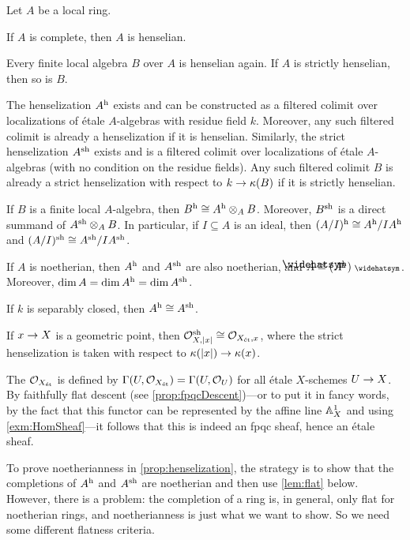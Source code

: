 \documentclass[a4paper, 10pt, oneside, DIV=9, chapterprefix=true, numbers=enddot, bibliography=totoc]{scrbook}
\begin{document}
\begin{prop}\label{prop:henselization}
	Let $A$ be a local ring.
	\begin{alphanumerate}
		\item If $A$ is complete, then $A$ is henselian.
		\item Every finite local algebra $B$ over $A$ is henselian again. If $A$ is strictly henselian, then so is $B$.
		\item The henselization $A^{\mathrm{h}}$ exists and can be constructed as a filtered colimit over localizations of étale $A$-algebras with residue field $k$. Moreover, any such filtered colimit is already a henselization if it is henselian. Similarly, the strict henselization $A^{\mathrm{sh}}$ exists and is a filtered colimit over localizations of étale $A$-algebras (with no condition on the residue fields). Any such filtered colimit $B$ is already a strict henselization with respect to $k\morphism \kappa(B)$ if it is strictly henselian.
		\item If $B$ is a finite local $A$-algebra, then $B^{\mathrm{h}}\cong A^{\mathrm{h}}\otimes_AB$. Moreover, $B^{\mathrm{sh}}$ is a direct summand of $A^{\mathrm{sh}}\otimes_AB$. In particular, if $I\subseteq A$ is an ideal, then $(A/I)^{\mathrm{h}}\cong A^{\mathrm{h}}/IA^{\mathrm{h}}$ and $(A/I)^{\mathrm{sh}}\cong A^{\mathrm{sh}}/IA^{\mathrm{sh}}$.
		\item If $A$ is noetherian, then $A^{\mathrm{h}}$ and $A^{\mathrm{sh}}$ are also noetherian, and $\roof{A}\cong (A^\h)^\complete$. Moreover, $\dim A=\dim A^{\mathrm{h}}=\dim A^{\mathrm{sh}}$.
		\item If $k$ is separably closed, then $A^{\mathrm{h}}\cong A^{\mathrm{sh}}$.
		\item If $x\morphism X$ is a geometric point, then $\mathcal{O}_{X,|x|}^{\mathrm{sh}}\cong \mathcal{O}_{X_{\mathrm{\acute{e}t}},x}$, where the strict henselization is taken with respect to $\kappa(|x|)\morphism \kappa(x)$.
	\end{alphanumerate}
\end{prop}
\begin{rem}
	The  $\mathcal{O}_{X_{\mathrm{\acute{e}t}}}$ is defined by $\operatorname{\Gamma}(U,\mathcal{O}_{X_{\mathrm{\acute{e}t}}})=\operatorname{\Gamma}(U,\mathcal{O}_U)$ for all étale $X$-schemes $U\morphism X$. By faithfully flat descent (see \cref{prop:fpqcDescent})---or to put it in fancy words, by the fact that this functor can be represented by the affine line $\mathbb{A}_X^1$ and using \cref{exm:HomSheaf}---it follows that this is indeed an fpqc sheaf, hence an étale sheaf.
\end{rem}
To prove noetherianness in \cref{prop:henselization}, the strategy is to show that the completions of $A^{\mathrm{h}}$ and $A^{\mathrm{sh}}$ are noetherian and then use \cref{lem:flat} below. However, there is a problem: the completion of a ring is, in general, only flat for noetherian rings, and noetherianness is just what we want to show. So we need some different flatness criteria.
\end{document}

